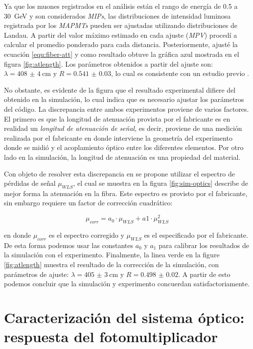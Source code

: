 Ya que los muones registrados en el análisis están el rango de energía de \num{0.5} a \SI{30}{\giga\electronvolt} y son considerados \emph{MIPs}, las distribuciones de intensidad luminosa registrada por los \emph{MAPMTs} pueden ser ajustadas utilizando distribuciones de Landau. A partir del valor máximo estimado en cada ajuste (\emph{MPV}) procedí a calcular el promedio ponderado para cada distancia. Posteriormente, ajusté la ecuación \ref{equ:fiber-att} y como resultado obtuve la gráfica azul mostrada en el figura \ref{fig:atlength}. Los parámetros obtenidos a partir del ajuste son: $\lambda=\SI{408(4)}{\cm}$ y $R=\num{0.541(30)}$, lo cual es consistente con un estudio previo \cite{itow13}.

No obstante, es evidente de la figura que el resultado experimental difiere del obtenido en la simulación, lo cual indica que es necesario ajustar los parámetros del código. La discrepancia entre ambos experimentos proviene de varios factores. El primero es que la longitud de atenuación provista por el fabricante es en realidad un \emph{longitud de atenuación de señal}, es decir, proviene de una medición realizada por el fabricante en donde interviene la geometría del experimento donde se midió y el acoplamiento óptico entre los diferentes elementos. Por otro lado en la simulación, la longitud de atenuación es una propiedad del material.

Con objeto de resolver esta discrepancia en \cite{dietz16} se propone utilizar el espectro de pérdidas de señal $\mu_{WLS}$, el cual se muestra en la figura \ref{fig:sim-optics} describe de mejor forma la atenuación en la fibra. Este espectro es provisto por el fabricante, sin embargo requiere un factor de corrección cuadrático:

\begin{equation}
\label{equ:quadcorr}
\mu_{corr}=a_{0}\cdot\mu_{WLS}+a{1}\cdot\mu^{2}_{WLS}
\end{equation}

en donde $\mu_{corr}$ es el espectro corregido y $\mu_{WLS}$ es el especificado por el fabricante. De esta forma podemos usar las constantes $a_{0}$ y $a_{1}$ para calibrar los resultados de la simulación con el experimento. Finalmente, la linea verde en la figure \ref{fig:atlength} muestra el resultado de la corrección de la simulación, con parámetros de ajuste: $\lambda=\SI{405(3)}{\cm}$ y $R=\num{0.498(20)}$. A partir de esto podemos concluir que la simulación y experimento concuerdan satisfactoriamente.

\section{Caracterización del sistema óptico: respuesta del fotomultiplicador}


